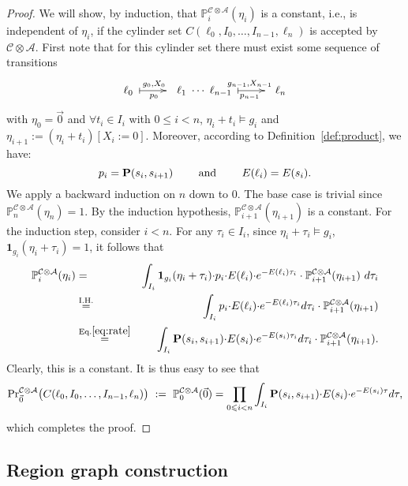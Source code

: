 \documentclass{LMCS}
\makeatletter
\newcommand{\mc}[1]{\mathcal{#1}}
\newcommand{\<}{\langle}
\renewcommand{\>}{\rangle}
\renewcommand{\P}{{\bf P}}
\newcommand{\Pro}{{\mathbb{P}}}
\newcommand{\updownmapsto}[4]{\xymatrix{#1\;\ar @{|->}[r]^{#2}_{#3}&#4}}
\makeatother
\begin{document}
\begin{proof}
We will show, by induction, that
$\Pro^{\mc{C}\otimes\mc{A}}_{i}(\eta_{i})$ is a constant, i.e., is
independent of $\eta_i$, if the cylinder set
$C(\ell_0,I_0,\ldots,I_{n-1},\ell_n)$ is
accepted by $\mc{C}\otimes\mc{A}$.  First note that for this cylinder set
there must exist some sequence of transitions
\[
\updownmapsto{\ell_{0}}{g_{0},X_{0}}{p_{0}}{\ \ \ell_{1}} \cdots
\updownmapsto{\ell_{n-1}}{g_{n-1},X_{n-1}}{p_{n-1}}{\ \ \ell_{n}}
\]
with $\eta_0=\vec{0}$ and  $\forall t_i\in I_i$ with $0\leqslant
i<n$, $\eta_i+t_i\models g_i$ and
$\eta_{i+1}:=(\eta_i+t_i)[X_i:=0]$. Moreover, according to
Definition~\ref{def:product}, we have:
\begin{equation}p_i=\P(s_i, s_{i+1})\qquad\mbox{ and }\qquad E(\ell_i)=E(s_i).\label{eq:rate}\end{equation}
We apply a backward induction on $n$ down to 0. The base case is
trivial since $\Pro^{\mc{C}\otimes\mc{A}}_n(\eta_n)=1$. By the induction hypothesis,
$\Pro^{\mc{C}\otimes\mc{A}}_{i+1}(\eta_{i+1})$ is a constant.  For the
induction step, consider $i<n$. For any $\tau_i\in I_i$, since
$\eta_i+\tau_i\models g_i$, $\mathbf{1}_{g_i}(\eta_i+\tau_i)=1$, it
follows that
\begin{eqnarray*}
\Pro^{\mc{C}\otimes\mc{A}}_{i}(\eta_{i})&=&\int_{I_{i}}\mathbf{1}_{g_i}(\eta_i+\tau_i){\cdot}
p_i{\cdot}E(\ell_i){\cdot}e^{-E(\ell_i)\tau_i}\cdot\Pro^{\mc{C}\otimes\mc{A}}_{i+1}(\eta_{i+1})\
d\tau_i\\
&\stackrel{\textrm{I.H.}}{=}& \int_{I_{i}}p_i{\cdot}E(\ell_i){\cdot}e^{- E(\ell_i)\tau_i}d\tau_i\cdot\Pro^{\mc{C}\otimes\mc{A}}_{i+1}(\eta_{i+1})\\
&\stackrel{\textrm{Eq.}\eqref{eq:rate}}{=}&\int_{I_{i}}\P(s_i,s_{i+1}){\cdot}E(s_i){\cdot}e^{- E(s_i)\tau_i}d\tau_i\cdot\Pro^{\mc{C}\otimes\mc{A}}_{i+1}(\eta_{i+1}).\\
\end{eqnarray*}
Clearly, this is a constant. It is thus easy to see that
\[{\Pr}_{\vec{0}}^{\mc{C}\otimes
\mc{A}}\big(C(\ell_0,I_0,\ldots,I_{n-1},\ell_n)\big)\ :=\
\Pro^{\mc{C}\otimes \mc{A}}_{0}(\vec{0})= \prod_{0\leqslant i<
n}\int_{I_i}\P(s_i,s_{i+1}){\cdot}E(s_i){\cdot}e^{-E(s_i)\tau}
d\tau ,\]which completes the proof.\end{proof}

\subsection{Region graph construction}\label{sec:region_DMTA}
\end{document}
